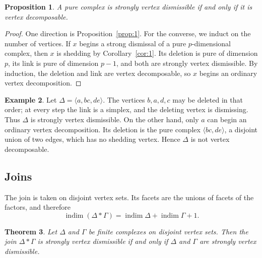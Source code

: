 \documentclass[11pt]{amsart}
\DeclareMathOperator{\indim}{indim}
\newtheorem{theorem}{Theorem}[section]
\newtheorem{proposition}[theorem]{Proposition}
\theoremstyle{definition}
\newtheorem{example}[theorem]{Example}
\begin{document}
	\begin{proposition}\label{prop:2}
		A pure complex is strongly vertex dismissible if and only if it is vertex decomposable.
	\end{proposition}
	
	\begin{proof}
		One direction is Proposition~\ref{prop:1}.  For the converse, we induct on the number of vertices.  If $x$ begins a strong dismissal of a pure $p$-dimensional complex, then $x$ is shedding by Corollary~\ref{cor:1}.  Its deletion is pure of dimension $p$, its link is pure of dimension $p-1$, and both are strongly vertex dismissible.  By induction, the deletion and link are vertex decomposable, so $x$ begins an ordinary vertex decomposition.
	\end{proof}
	
	\begin{example}\label{ex:2}
		Let $\Delta=\langle a,bc,de\rangle$. The vertices $b,a,d,c$ may be deleted in that order; at every step the link is a simplex, and the deleting vertex is dismissing.  Thus $\Delta$ is strongly vertex dismissible.  On the other hand, only $a$ can begin an ordinary vertex decomposition.  Its deletion is the pure complex $\langle bc,de\rangle$, a disjoint union of two edges, which has no shedding vertex.  Hence $\Delta$ is not vertex decomposable.
	\end{example}
	
	\subsection{Joins}
	
	The join is taken on disjoint vertex sets.  Its facets are the unions of facets of the factors, and therefore
	\[
	\indim(\Delta*\Gamma)
	=\indim\Delta+\indim\Gamma+1.
	\]
	
	\begin{theorem}\label{thm:1}
		Let $\Delta$ and $\Gamma$ be finite complexes on disjoint vertex sets.  Then the join $\Delta*\Gamma$ is strongly vertex dismissible if and only if $\Delta$ and $\Gamma$ are strongly vertex dismissible.
	\end{theorem}
	
\end{document}
